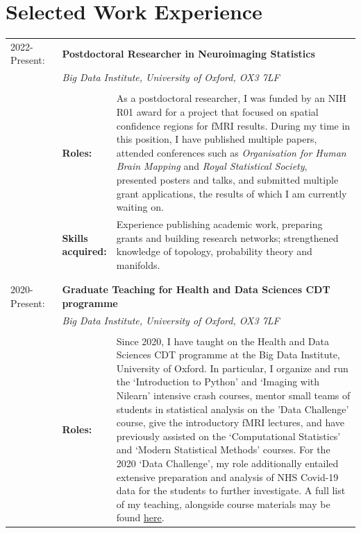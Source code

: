 \documentclass{friggeri-cv}
\begin{document}
\section{Selected Work Experience}



\begin{longtable}{p{0.15\linewidth} p{0.1\linewidth} p{0.75\linewidth}}
     2022-Present: & \multicolumn{2}{p{0.85\linewidth}}{\textbf{Postdoctoral Researcher in Neuroimaging Statistics}} \\
     & \multicolumn{2}{p{0.85\linewidth}}{\textit{Big Data Institute, University of Oxford, OX3 7LF}} \\
     & \\
     & \textbf{Roles:} & As a postdoctoral researcher, I was funded by an NIH R01 award for a project that focused on spatial confidence regions for fMRI results. During my time in this position, I have published multiple papers, attended conferences such as \textit{Organisation for Human Brain Mapping} and \textit{Royal Statistical Society}, presented posters and talks, and submitted multiple grant applications, the results of which I am currently waiting on.  
     & \\
     & \textbf{Skills acquired:} & Experience publishing academic work, preparing grants and building research networks; strengthened knowledge of topology, probability theory and manifolds.\\
     & \\
     & \\
     2020-Present: & \multicolumn{2}{p{0.85\linewidth}}{\textbf{Graduate Teaching for Health and Data Sciences CDT programme}} \\
     & \multicolumn{2}{p{0.85\linewidth}}{\textit{Big Data Institute, University of Oxford, OX3 7LF}} \\
     & \\
     & \textbf{Roles:} & Since 2020, I have taught on the Health and Data Sciences CDT programme at the Big Data Institute, University of Oxford. In particular, I organize and run the `Introduction to Python' and `Imaging with Nilearn' intensive crash courses, mentor small teams of students in statistical analysis on the 'Data Challenge' course, give the introductory fMRI lectures, and have previously assisted on the `Computational Statistics' and `Modern Statistical Methods' courses. For the 2020 ‘Data Challenge’, my role additionally entailed extensive preparation and analysis of NHS Covid-19 data for the students to further investigate. A full list of my teaching, alongside course materials may be found \href{https://tommaullin.com/teaching.html}{\underline{here}}.\\

\end{longtable}
\end{document}
